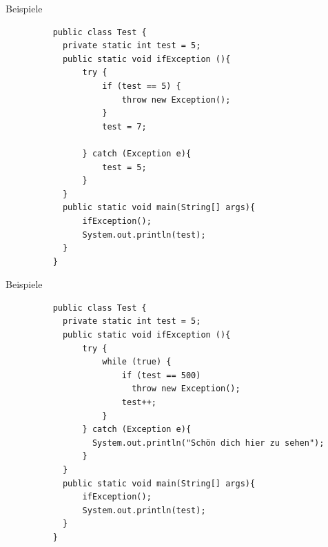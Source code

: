 \documentclass[18pt]{beamer}
\begin{document}
\begin{frame}[fragile]{Beispiele}
\begin{figure}
   \begin{lstlisting}
    public class Test {
	  private static int test = 5;
	  public static void ifException (){
		  try {
			  if (test == 5) {
				  throw new Exception();
			  }
			  test = 7;

		  } catch (Exception e){
			  test = 5;
		  }
	  }
	  public static void main(String[] args){
		  ifException();
		  System.out.println(test);
	  }
    }
  \end{lstlisting}
\end{figure}


\end{frame}

\begin{frame}[fragile]{Beispiele}
\begin{figure}
   \begin{lstlisting}
    public class Test {
	  private static int test = 5;
	  public static void ifException (){
		  try {
			  while (true) {
				  if (test == 500)
				    throw new Exception();
				  test++;
			  }
		  } catch (Exception e){
		    System.out.println("Schön dich hier zu sehen");			  
		  }
	  }
	  public static void main(String[] args){
		  ifException();
		  System.out.println(test);
	  }
    }
  \end{lstlisting}
\end{figure}


\end{frame}
\end{document}
